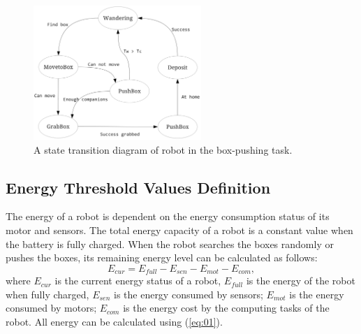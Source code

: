 \documentclass[journal]{IEEEtran}
\begin{document}
%
%
\begin{figure}[!t]
\centering
\includegraphics[width=2.5in]{state_trans.png}
\caption{A state transition diagram of robot in the box-pushing task.}
\label{fig:1}
\end{figure}

\subsection{Energy Threshold Values Definition}
\label{subsec:2}
The energy of a robot is dependent on the energy consumption status of its motor and sensors. The total energy capacity of a robot is a constant value when the battery is fully charged. When the robot searches the boxes randomly or pushes the boxes, its remaining energy level can be calculated as follows:
%
\begin{equation}
E_{cur} = E_{full} - E_{sen} - E_{mot} - E_{com},
\label{eq:01}
\end{equation}
%
where $E_{cur}$ is the current energy status of a robot, $E_{full}$ is the energy of the robot when fully charged, $E_{sen}$ is the energy consumed by sensors; $E_{mot}$ is the energy consumed by motors; $E_{com}$ is the energy cost by the computing tasks of the robot. All energy can be calculated using (\ref{eq:01}).
\end{document}
